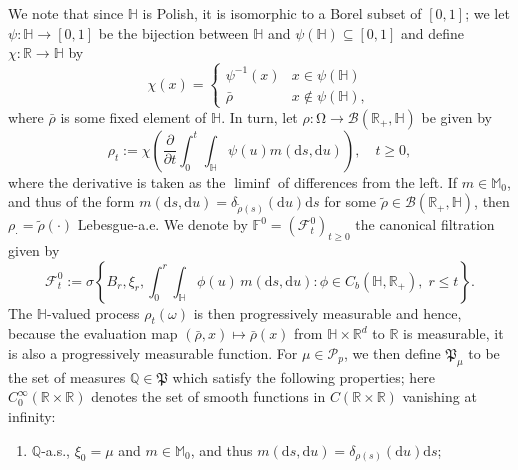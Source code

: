 \documentclass{article}
\theoremstyle{definition}
\numberwithin{equation}{section}
\numberwithin{theorem}{section}
\newcommand{\Pp}{\mathbb{Q}}
\newcommand{\di}{\mathrm{d}}
\newcommand{\R}{\mathbb{R}}
\newcommand{\ds}{\mathrm{d}s}
\newcommand{\du}{\mathrm{d}u}
\newcommand{\Fb}{\mathbb{F}}
\newcommand{\Fc}{\mathcal{F}}
\newcommand{\Hb}{\mathbb{H}}
\newcommand{\Mb}{\mathbb{M}}
\newcommand{\Pc}{\mathcal{P}}
\newcommand{\Bc}{\mathcal{B}}
\def\comment#1{\marginpar{\raggedright\scriptsize{\textcolor{red}{#1}}}}
\newcommand{\Pk}{\mathfrak{P}}
\begin{document}
\begin{appendix}
	We note that since $\Hb$ is Polish, it is isomorphic to a Borel subset of $[0,1]$; we let $\psi \colon \Hb\to[0,1]$ be the bijection between $\Hb$ and $\psi(\Hb)\subseteq[0,1]$ and define $\chi:\R\to\Hb$ by
	\begin{equation*}
		\chi(x)=\left\{\begin{array}{lll}
		\psi^{-1}(x) & x\in\psi(\Hb)\\
		\bar\rho & x\not\in\psi(\Hb),
		\end{array}\right.
	\end{equation*}	
	where $\bar\rho$ is some fixed element of $\Hb$. 
	In turn, let $\rho:\mathrm{\Omega}\to\Bc(\R_+,\Hb)$ be given by
		\begin{equation*}
			\rho_t:=\chi\left(\frac{\partial}{\partial t}\int_0^t\int_\Hb\psi(u)m(\ds,\du)\right), \quad t\ge 0, 
                      \end{equation*}
         where the derivative is taken as the $\liminf$ of differences from the left.
	If $m\in\Mb_0$, and thus of the form $m(\ds,\du)=\delta_{\tilde\rho(s)}(\du)\ds$ for some $\tilde\rho\in\Bc(\R_+,\Hb)$, then $\rho_\cdot=\tilde\rho(\cdot)$ Lebesgue-a.e.
	We denote by $\Fb^0=(\Fc^0_t)_{t\ge 0}$ the canonical filtration given by 
		\begin{equation*}
			\Fc^0_t:=\sigma\left\{B_r,\xi_r, \int_0^r \int_\Hb \phi(u) \, m(\di s,\du) : \phi\in C_b(\Hb,\R_+),\; r\le t\right\}.
		\end{equation*}
The $\Hb$-valued process $\rho_t(\omega)$ is then progressively measurable and hence, because the evaluation map $(\bar\rho,x)\mapsto \bar\rho(x)$ from $\Hb \times \R^d$ to $\R$ is measurable, it is also a progressively measurable function.
	 For $\mu\in\Pc_p$, we then define $\Pk_\mu$ to be the set of measures $\Pp\in\Pk$ which satisfy the following properties; here $ C^\infty_0(\R\times\R)$ denotes the set of smooth functions in $C(\R\times \R)$ vanishing at infinity:
	\begin{enumerate}
		\item\label{it3i}  $\Pp$-a.s., $\xi_0=\mu$ and $m\in\Mb_0$, and thus $m(\ds,\du)=\delta_{\rho(s)}(\du)\ds$;

\end{enumerate}
\end{appendix}
\end{document}
